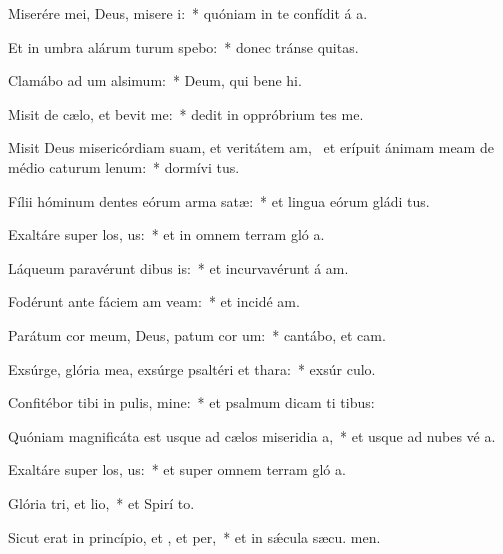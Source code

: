 \item Miserére mei, Deus, misere i:~* quóniam in te confídit á a.
\item Et in umbra alárum turum spebo:~* donec tránse quitas.
\item Clamábo ad um alsimum:~* Deum, qui bene hi.
\item Misit de cælo, et bevit me:~* dedit in oppróbrium tes me.
\item Misit Deus misericórdiam suam, et veritátem am,~\pscross{} et erípuit ánimam meam de médio caturum lenum:~* dormívi tus.
\item Fílii hóminum dentes eórum arma  satæ:~* et lingua eórum gládi tus.
\item Exaltáre super los, us:~* et in omnem terram gló a.
\item Láqueum paravérunt dibus is:~* et incurvavérunt á am.
\item Fodérunt ante fáciem am veam:~* et incidé  am.
\item Parátum cor meum, Deus, patum cor um:~* cantábo, et  cam.
\item Exsúrge, glória mea, exsúrge psaltéri et thara:~* exsúr culo.
\item Confitébor tibi in pulis, mine:~* et psalmum dicam ti  tibus:
\item Quóniam magnificáta est usque ad cælos miseridia a,~* et usque ad nubes vé a.
\item Exaltáre super los, us:~* et super omnem terram gló a.
\item Glória tri, et lio,~* et Spirí to.
\item Sicut erat in princípio, et , et per,~* et in sǽcula sæcu. men.

